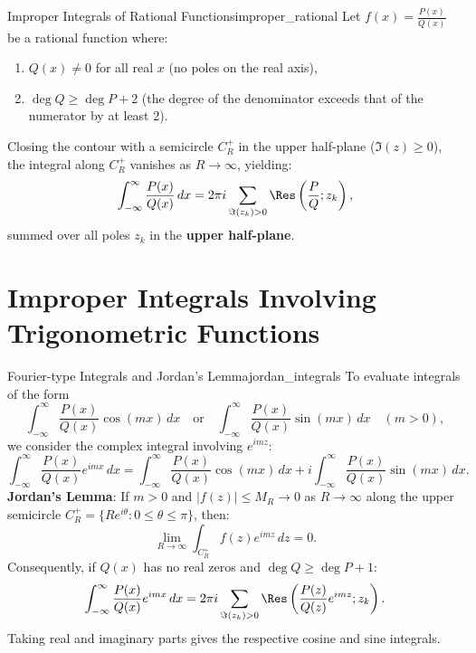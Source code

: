 \begin{theorem}{Improper Integrals of Rational Functions}{improper_rational}
Let $f(x) = \frac{P(x)}{Q(x)}$ be a rational function where:
\begin{enumerate}
    \item $Q(x) \neq 0$ for all real $x$ (no poles on the real axis),
    \item $\deg Q \ge \deg P + 2$ (the degree of the denominator exceeds that of the numerator by at least 2).
\end{enumerate}
Closing the contour with a semicircle $C_R^+$ in the upper half-plane ($\Im(z) \ge 0$), the integral along $C_R^+$ vanishes as $R \to \infty$, yielding:
\begin{equation}
\int_{-\infty}^\infty \frac{P(x)}{Q(x)}\, dx = 2\pi i \sum_{\Im(z_k) > 0} \Res\left(\frac{P}{Q}; z_k\right),
\end{equation}
summed over all poles $z_k$ in the \textbf{upper half-plane}.
\end{theorem}


\section{Improper Integrals Involving Trigonometric Functions}

\begin{theorem}{Fourier-type Integrals and Jordan's Lemma}{jordan_integrals}
To evaluate integrals of the form
\begin{equation}
\int_{-\infty}^\infty \frac{P(x)}{Q(x)} \cos(mx)\, dx \quad \text{or} \quad \int_{-\infty}^\infty \frac{P(x)}{Q(x)} \sin(mx)\, dx \quad (m > 0),
\end{equation}
we consider the complex integral involving $e^{imz}$:
\begin{equation}
\int_{-\infty}^\infty \frac{P(x)}{Q(x)} e^{imx}\, dx = \int_{-\infty}^\infty \frac{P(x)}{Q(x)} \cos(mx)\, dx + i \int_{-\infty}^\infty \frac{P(x)}{Q(x)} \sin(mx)\, dx.
\end{equation}
\textbf{Jordan's Lemma}: If $m > 0$ and $|f(z)| \le M_R \to 0$ as $R \to \infty$ along the upper semicircle $C_R^+ = \{R e^{i\theta} : 0 \le \theta \le \pi\}$, then:
\begin{equation}
\lim_{R \to \infty} \int_{C_R^+} f(z) e^{imz}\, dz = 0.
\end{equation}
Consequently, if $Q(x)$ has no real zeros and $\deg Q \ge \deg P + 1$:
\begin{equation}
\int_{-\infty}^\infty \frac{P(x)}{Q(x)} e^{imx}\, dx = 2\pi i \sum_{\Im(z_k) > 0} \Res\left(\frac{P(z)}{Q(z)} e^{imz}; z_k\right).
\end{equation}
Taking real and imaginary parts gives the respective cosine and sine integrals.
\end{theorem}


